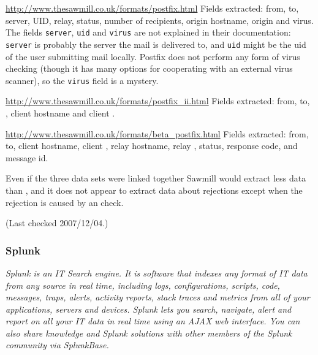 \url{http://www.thesawmill.co.uk/formats/postfix.html} \newline Fields
extracted: from, to, server, UID, relay, status, number of recipients,
origin hostname, origin \IP{} and virus.  The fields \texttt{server},
\texttt{uid} and \texttt{virus} are not explained in their documentation:
\texttt{server} is probably the server the mail is delivered to, and
\texttt{uid} might be the uid of the user submitting mail locally.  Postfix
does not perform any form of virus checking (though it has many options for
cooperating with an external virus scanner), so the \texttt{virus} field is
a mystery.

\url{http://www.thesawmill.co.uk/formats/postfix_ii.html} \newline Fields
extracted: from, to, \RBL{}, client hostname and client \IP{}\@.

\url{http://www.thesawmill.co.uk/formats/beta_postfix.html} \newline Fields
extracted: from, to, client hostname, client \IP{}, relay hostname, relay
\IP{}, status, response code, \RBL{} and message id.

Even if the three data sets were linked together Sawmill would extract less
data than \parsername{}, and it does not appear to extract data about
rejections except when the rejection is caused by an \RBL{} check.

(Last checked 2007/12/04.)

\subsubsection{Splunk}

\textit{Splunk is an IT Search engine. It is software that indexes any
format of IT data from any source in real time, including logs,
configurations, scripts, code, messages, traps, alerts, activity reports,
stack traces and metrics from all of your applications, servers and
devices. Splunk lets you search, navigate, alert and report on all your IT
data in real time using an AJAX web interface. You can also share knowledge
and Splunk solutions with other members of the Splunk community via
SplunkBase.\/}

